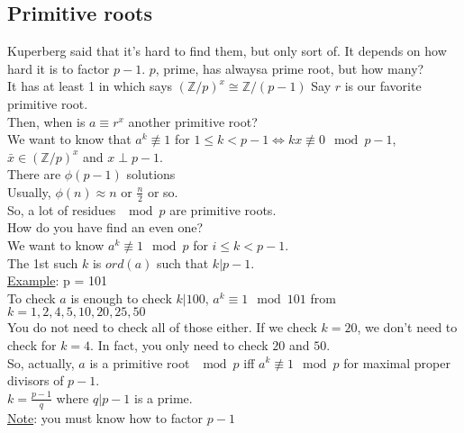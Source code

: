 \documentclass[13pt]{article}
\begin{document}
	\subsection*{Primitive roots}
		Kuperberg said that it's hard to find them, but only sort of. It depends
		on how hard it is to factor $p-1$. $p$, prime, has alwaysa prime root,
		but how many?\\
		It has at least 1 in which says $(\mathbb{Z}/p)^x \cong \mathbb{Z}/(p-1)$
		Say $r$ is our favorite primitive root.\\
		Then, when is $a \equiv r^x$ another primitive root?\\
		We want to know that $a^k \not\equiv 1$ for $1 \le k < p-1
		\Leftrightarrow kx \not\equiv 0 \mod p-1$, 
		$\bar{x} \in (\mathbb{Z}/p)^x$ and $x \perp p-1$.\\
		There are $\phi(p-1)$ solutions\\
		Usually, $\phi(n) \approx n$ or $\frac{n}{2}$ or so.\\
		So, a lot of residues $\mod p$ are primitive roots.\\
		How do you have find an even one?\\
		We want to know $a^k \not\equiv 1 \mod p$ for $i \le k < p-1$.\\
		The 1st such $k$ is $ord(a)$ such that $k | p -1$. \\
		\underline{Example}: p = 101 \\
		To check $a$ is enough to check  $k | 100$, $a^k \equiv 1 \mod 101$ from
		$k = 1, 2, 4, 5, 10, 20, 25, 50$\\
		You do not need to check all of those either. If we check $k = 20$,
		we don't need to check for $k = 4$. In fact, you only need to check
		$20$ and $50$.\\
		So, actually, $a$ is a primitive root $\mod p$ iff $a^k \not\equiv 1 \mod
		p$ for maximal proper divisors of $p-1$.\\
		$k = \frac{p-1}{q}$ where $q | p-1$ is a prime.\\
		\underline{Note}: you must know how to factor $p-1$
\end{document}

